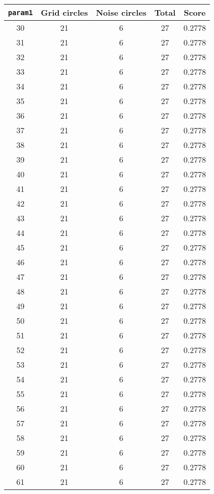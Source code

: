\documentclass[letterpaper, 12pt]{article}
\begin{document}
\begin{longtable}{|c|c|c|c|c|}
\hline
\textbf{\texttt{param1}} & \textbf{Grid circles} & \textbf{Noise circles} & \textbf{Total} & \textbf{Score} \\
\hline
30 & 21 & 6 & 27 & 0.2778 \\
\hline
31 & 21 & 6 & 27 & 0.2778 \\
\hline
32 & 21 & 6 & 27 & 0.2778 \\
\hline
33 & 21 & 6 & 27 & 0.2778 \\
\hline
34 & 21 & 6 & 27 & 0.2778 \\
\hline
35 & 21 & 6 & 27 & 0.2778 \\
\hline
36 & 21 & 6 & 27 & 0.2778 \\
\hline
37 & 21 & 6 & 27 & 0.2778 \\
\hline
38 & 21 & 6 & 27 & 0.2778 \\
\hline
39 & 21 & 6 & 27 & 0.2778 \\
\hline
40 & 21 & 6 & 27 & 0.2778 \\
\hline
41 & 21 & 6 & 27 & 0.2778 \\
\hline
42 & 21 & 6 & 27 & 0.2778 \\
\hline
43 & 21 & 6 & 27 & 0.2778 \\
\hline
44 & 21 & 6 & 27 & 0.2778 \\
\hline
45 & 21 & 6 & 27 & 0.2778 \\
\hline
46 & 21 & 6 & 27 & 0.2778 \\
\hline
47 & 21 & 6 & 27 & 0.2778 \\
\hline
48 & 21 & 6 & 27 & 0.2778 \\
\hline
49 & 21 & 6 & 27 & 0.2778 \\
\hline
50 & 21 & 6 & 27 & 0.2778 \\
\hline
51 & 21 & 6 & 27 & 0.2778 \\
\hline
52 & 21 & 6 & 27 & 0.2778 \\
\hline
53 & 21 & 6 & 27 & 0.2778 \\
\hline
54 & 21 & 6 & 27 & 0.2778 \\
\hline
55 & 21 & 6 & 27 & 0.2778 \\
\hline
56 & 21 & 6 & 27 & 0.2778 \\
\hline
57 & 21 & 6 & 27 & 0.2778 \\
\hline
58 & 21 & 6 & 27 & 0.2778 \\
\hline
59 & 21 & 6 & 27 & 0.2778 \\
\hline
60 & 21 & 6 & 27 & 0.2778 \\
\hline
61 & 21 & 6 & 27 & 0.2778 \\

\end{longtable}
\end{document}
